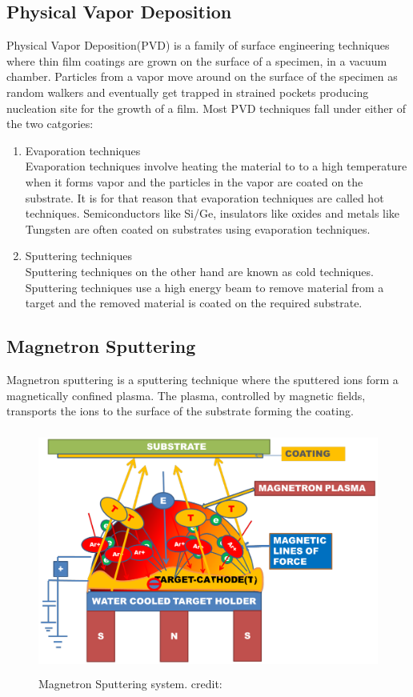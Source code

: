\documentclass[12pt]{article}
\begin{document}
	\subsection{Physical Vapor Deposition}
	Physical Vapor Deposition(PVD) is a family of surface engineering techniques where thin film coatings are grown on the surface of a specimen, in a vacuum chamber. Particles from a vapor move around on the surface of the specimen as random walkers and eventually get trapped in strained pockets producing nucleation site for the growth of a film. Most PVD techniques fall under either of the two catgories:
	\begin{enumerate}
		\item Evaporation techniques \\
		Evaporation techniques involve heating the material to  to a high temperature when it forms vapor and the particles in the vapor are coated on the substrate. It is for that reason that evaporation techniques are called hot techniques. Semiconductors like Si/Ge, insulators like oxides and metals like Tungsten are often coated on substrates using evaporation techniques. 
		
		\item Sputtering techniques \\
		Sputtering techniques on the other hand are known as cold techniques. Sputtering techniques use a high energy beam to remove material from a target and the removed material is coated on the required substrate.
		
	\end{enumerate}

	\subsection{Magnetron Sputtering}
	Magnetron sputtering is a sputtering technique where the sputtered ions form a magnetically confined plasma. The plasma, controlled by magnetic fields, transports the ions to the surface of the substrate forming the coating. 
	
	
	\begin{figure}[H]
		\begin{center}
			\includegraphics[width=12cm, height=8cm]{magnetron sputtering.png} \caption{Magnetron Sputtering system. credit: \cite{SurfaceEng}}
		\end{center}
	\end{figure}
	
\end{document}
